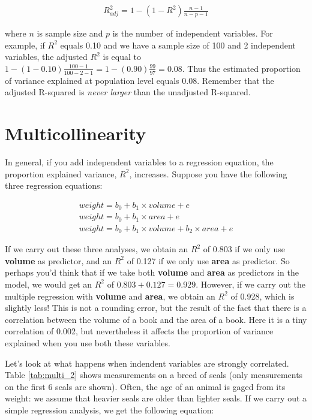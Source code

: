 \documentclass[]{book}\usepackage[]{graphicx}\usepackage[]{color}
\begin{document}
\begin{eqnarray}
R^2_{adj}= 1 - (1-R^2)\frac{n-1}{n-p-1} \nonumber
\end{eqnarray}

where $n$ is sample size and $p$ is the number of independent variables. For example, if $R^2$ equals 0.10 and we have a sample size of 100 and 2 independent variables, the adjusted $R^2$ is equal to $1 - (1-0.10)\frac{100-1}{100-2-1}= 1 - (0.90)\frac{99}{97}=0.08$. Thus the estimated proportion of variance explained at population level equals 0.08. Remember that the adjusted R-squared is \textit{never larger} than the unadjusted R-squared.




\section{Multicollinearity}

In general, if you add independent variables to a regression equation, the proportion explained variance, $R^2$, increases. Suppose you have the following three regression equations:

\begin{eqnarray}
weight = b_0 + b_1 \times  volume + e \\
weight = b_0 + b_1 \times  area + e \\
weight = b_0 + b_1 \times  volume + b_2 \times  area + e
\end{eqnarray}

If we carry out these three analyses, we obtain an $R^2$ of 0.803 if we only use \textbf{volume} as predictor, and an $R^2$ of 0.127 if we only use \textbf{area} as predictor. So perhaps you'd think that if we take both \textbf{volume} and \textbf{area} as predictors in the model, we would get an $R^2$ of $0.803+0.127= 0.929$. However, if we carry out the multiple regression with \textbf{volume} and \textbf{area}, we obtain an $R^2$ of 0.928, which is slightly less! This is not a rounding error, but the result of the fact that there is a correlation between the volume of a book and the area of a book. Here it is a tiny correlation of 0.002, but nevertheless it affects the proportion of variance explained when you use both these variables.


Let's look at what happens when indendent variables are strongly correlated. Table \ref{tab:multi_2} shows measurements on a breed of seals (only measurements on the first 6 seals are shown). Often, the age of an animal is gaged from its weight: we assume that heavier seals are older than lighter seals. If we carry out a simple regression analysis, we get the following equation:
\end{document}
